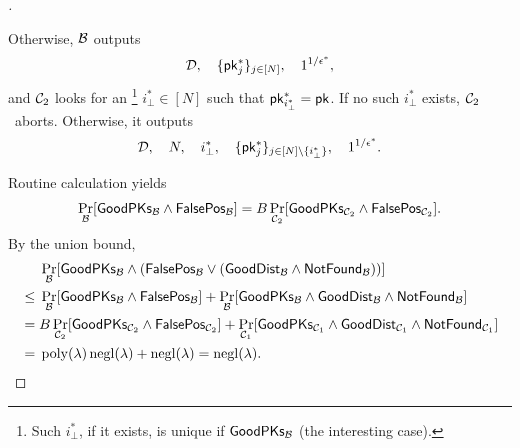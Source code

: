 \begin{proof}[]
\begin{itemize}
Otherwise, ${\mathcal{B}}$ outputs
\begin{align*}
\scriptD,\quad
\{\pk_j^\ast\}_{j\in[N]},\quad
1^{1/\epsilon^\ast},
\end{align*}
and ${\mathcal{C}}_2$ looks for an%
\footnote{Such $i_\bot^\ast$, if it exists, is unique if $\GoodPKs_\scriptB$
(the interesting case).}
${i_\bot^\ast\in[N]}$ such that ${\pk_{i_\bot^\ast}^\ast=\pk}$.
If no such $i_\bot^\ast$ exists, ${\mathcal{C}}_2$~aborts.
Otherwise, it outputs
\begin{align*}
\scriptD,\quad
N,\quad
i_\bot^\ast,\quad
\{\pk_j^\ast\}_{j\in{[N]\setminus{\{i_\bot^\ast\}}}},\quad
1^{1/\epsilon^\ast}.
\end{align*}
\end{itemize}
Routine calculation yields
\begin{align*}
\Pr_\scriptB[\GoodPKs_\scriptB\wedge\FalsePos_\scriptB]
=
B\Pr_{\scriptC_2}[\GoodPKs_{\scriptC_2}\wedge\FalsePos_{\scriptC_2}].
\end{align*}
By the union bound,
\begin{align*}
&
\Pr_\scriptB[\GoodPKs_\scriptB\wedge(\FalsePos_\scriptB\vee(\GoodDist_\scriptB\wedge\NotFound_\scriptB))]
\\\WideNarrow{}{\mathllap}{{}\leq{}}&
\Pr_\scriptB[\GoodPKs_\scriptB\wedge\FalsePos_\scriptB]
+
\Pr_\scriptB[\GoodPKs_\scriptB\wedge\GoodDist_\scriptB\wedge\NotFound_\scriptB]
\\\WideNarrow{}{\mathllap}{{}={}}&
B\Pr_{\scriptC_2}[\GoodPKs_{\scriptC_2}\wedge\FalsePos_{\scriptC_2}]
+
\Pr_{\scriptC_1}
[\GoodPKs_{\scriptC_1}\wedge\GoodDist_{\scriptC_1}\wedge\NotFound_{\scriptC_1}]
\WideNarrow{}{\hspace*{-1em}}
\\\WideNarrow{}{\mathllap}{{}={}}&
\poly(\lambda)\negl(\lambda)+\negl(\lambda)
=
\negl(\lambda).
\qedhere
\end{align*}
\end{proof}
